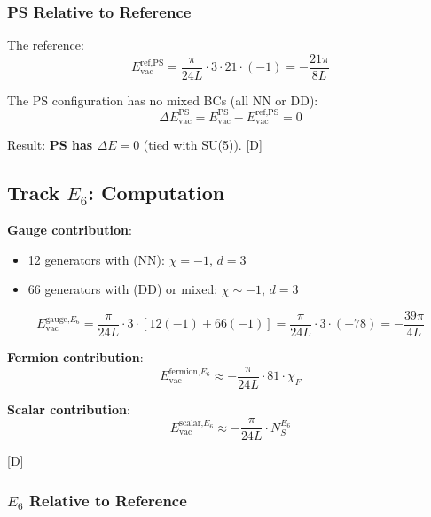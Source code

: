 \documentclass[11pt,a4paper]{article}
\newcommand{\tagD}{\textcolor{blue!70!black}{[D]}}
\begin{document}
\subsubsection{PS Relative to Reference}

The reference:
\begin{equation}
\label{eq:ps-ref}
E_{\text{vac}}^{\text{ref,PS}} = \frac{\pi}{24L} \cdot 3 \cdot 21 \cdot (-1) = -\frac{21\pi}{8L}
\end{equation}

The PS configuration has no mixed BCs (all NN or DD):
\begin{equation}
\label{eq:ps-delta}
\Delta E_{\text{vac}}^{\text{PS}} = E_{\text{vac}}^{\text{PS}} - E_{\text{vac}}^{\text{ref,PS}} = 0
\end{equation}

Result: \textbf{PS has $\Delta E = 0$} (tied with SU(5)). \tagD

\subsection{Track $E_6$: Computation}

\begin{computebox}
\textbf{Gauge contribution}:
\begin{itemize}
    \item 12 generators with (NN): $\chi = -1$, $d = 3$
    \item 66 generators with (DD) or mixed: $\chi \sim -1$, $d = 3$
\end{itemize}
\begin{equation}
\label{eq:e6-gauge}
E_{\text{vac}}^{\text{gauge,}E_6} = \frac{\pi}{24L} \cdot 3 \cdot [12(-1) + 66(-1)]
= \frac{\pi}{24L} \cdot 3 \cdot (-78) = -\frac{39\pi}{4L}
\end{equation}

\textbf{Fermion contribution}:
\begin{equation}
\label{eq:e6-ferm}
E_{\text{vac}}^{\text{fermion,}E_6} \approx -\frac{\pi}{24L} \cdot 81 \cdot \chi_F
\end{equation}

\textbf{Scalar contribution}:
\begin{equation}
\label{eq:e6-scalar}
E_{\text{vac}}^{\text{scalar,}E_6} \approx -\frac{\pi}{24L} \cdot N_S^{E_6}
\end{equation}

\tagD
\end{computebox}

\subsubsection{$E_6$ Relative to Reference}
\end{document}
